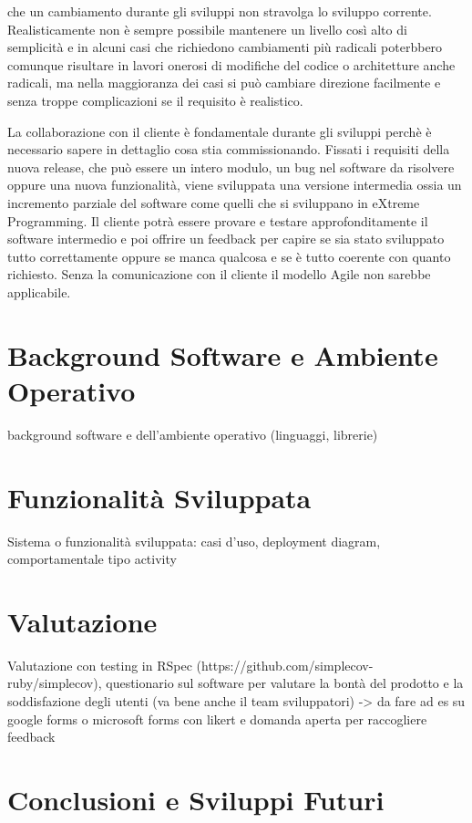 \documentclass[target=bach,aauheader=,style=]{thud}
\begin{document}
che un cambiamento durante gli sviluppi non stravolga lo sviluppo corrente. Realisticamente non è sempre possibile mantenere un livello così alto di semplicità
e in alcuni casi che richiedono cambiamenti più radicali poterbbero comunque risultare in lavori onerosi di modifiche del codice o architetture anche radicali,
ma nella maggioranza dei casi si può cambiare direzione facilmente e senza troppe complicazioni se il requisito è realistico.
\par La collaborazione con il cliente è fondamentale durante gli sviluppi perchè è necessario sapere in dettaglio cosa stia commissionando.
Fissati i requisiti della nuova release, che può essere un intero modulo, un bug nel software da risolvere oppure una nuova funzionalità, viene sviluppata
una versione intermedia ossia un incremento parziale del software come quelli che si sviluppano in eXtreme Programming. Il cliente potrà essere provare e
testare approfonditamente il software intermedio e poi offrire un feedback per capire se sia stato sviluppato tutto correttamente oppure se manca qualcosa
e se è tutto coerente con quanto richiesto. Senza la comunicazione con il cliente il modello Agile non sarebbe applicabile.

\chapter{Background Software e Ambiente Operativo}

background software e dell'ambiente operativo (linguaggi, librerie)

\chapter{Funzionalità Sviluppata}

Sistema o funzionalità sviluppata: casi d'uso, deployment diagram, comportamentale tipo activity

\chapter{Valutazione}

Valutazione con testing in RSpec (https://github.com/simplecov-ruby/simplecov), questionario sul software per valutare
la bontà del prodotto e la soddisfazione degli utenti (va bene anche il team sviluppatori) -> da fare ad es su google forms o
microsoft forms con likert e domanda aperta per raccogliere feedback

\chapter{Conclusioni e Sviluppi Futuri}
\end{document}
